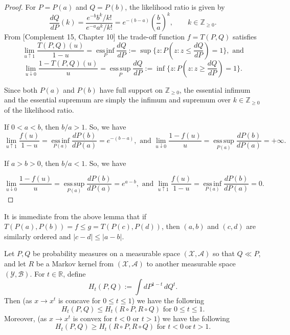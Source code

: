 \begin{proof}
For \(P=P(a)\) and \(Q=P(b)\),  the likelihood ratio is given by 
\[
\frac{dQ}{dP}(k)
=
\frac{e^{-b}b^k/k!}{e^{-a}a^k/k!}
=
e^{-(b-a)}
\left(\frac ba\right)^k,
\qquad k\in\mathbb{Z}_{\geq 0} .
\]
From \cite{torgersen1991comparison}[Complement 15, Chapter 10]  the trade-off function $f=T(P,Q)$  satisfies
\[
\lim_{u\uparrow 1}\frac{T(P,Q)(u)}{1-u}
=
\operatorname*{ess\,inf}_{P}\frac{dQ}{dP} := \sup\{z: P\left(z: z\leq \frac{dQ}{dP}\right)=1 \}, \text{ and}
\]
\[
\lim_{u\downarrow 0}\frac{1-T(P,Q)(u)}{u}
=
\operatorname*{ess\,sup}_{P}\frac{dQ}{dP} := \inf\{z: P\left(z: z\geq \frac{dQ}{dP}\right)=1 \}.
\]

Since both \(P(a)\) and \(P(b)\) have full support on \( \mathbb{Z}_{\geq 0}\), the essential infimum and the essential supremum are simply the infimum and supremum over \(k\in \mathbb{Z}_{\geq 0}\) of the likelihood ratio.

If \(0<a<b\), then \(b/a>1\). So, we have 
\[
\lim_{u\uparrow 1}\frac{f(u)}{1-u}= \operatorname*{ess\,inf}_{P(a)}
\frac{dP(b)}{dP(a)}
=
e^{-(b-a)},
\text{ and }
\lim_{u\downarrow 0}\frac{1-f(u)}{u}
=
\operatorname*{ess\,sup}_{P(a)}
\frac{dP(b)}{dP(a)}
=
+\infty.
\]

If \(a>b>0\), then \(b/a<1\). So, we have

\[
\lim_{u\downarrow 0}\frac{1-f(u)}{u}
=
\operatorname*{ess\,sup}_{P(a)}
\frac{dP(b)}{dP(a)}
=
e^{a-b},
\text{ and }
\lim_{u\uparrow 1}\frac{f(u)}{1-u}
=
\operatorname*{ess\,inf}_{P(a)}
\frac{dP(b)}{dP(a)}
=
0.
\]
\end{proof}
\begin{remark}
    It is immediate from the above lemma  that if $T(P(a), P(b))=f \leq g= T(P(c), P(d))$, then $(a,b)$ and $(c,d)$ are similarly ordered and $|c-d|\leq |a-b|$.
 \end{remark}


\begin{lemma} \label{lem:Hellinger}
Let \(P,Q\) be probability measures on a measurable space \((\mathcal X,\mathcal A)\) so that $Q\ll P$, and let
\(R\) be a Markov kernel from \((\mathcal X,\mathcal A)\) to another measurable space
\((\mathcal Y,\mathcal B)\). For \(t\in\mathbb R\), define
\[
H_t(P,Q):=\int dP^{1-t}\,dQ^t.
\]
Then (as $x \to x^t$ is concave for $0\leq t\leq 1$) we have the following 
\begin{equation}
H_t(P,Q)\le H_t(R\circ P,R\circ Q) \text{ for } 0\le t\le 1.
\end{equation}
Moreover, (as $x \to x^t$ is convex for $t<0$ or $t> 1$) we have the following 
\begin{equation}
H_t(P,Q)\ge H_t(R\circ P,R\circ Q)
\text{ for }t<0 \ \text{or}\ t>1.
\end{equation}
\end{lemma}

